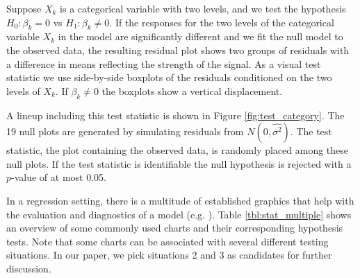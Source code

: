 \documentclass{article}
\newcommand{\blue}[1]{{\color{blue} #1}}
\begin{document}
Suppose $X_k$ is a categorical variable with two levels, and we test the hypothesis $H_0:\beta_k=0$ vs $H_1: \beta_k \ne 0$. If the responses for the two levels of the categorical variable $X_k$ in the model are significantly different and we fit the null model to the observed data, the resulting residual plot shows two groups of residuals \blue{with a difference in means reflecting the strength of the signal}. As a visual test statistic we use side-by-side boxplots of the residuals conditioned on the two levels of $X_k$. If $\beta_k\ne 0$ the boxplots show a vertical displacement. 


A lineup including this test statistic is shown in Figure \ref{fig:test_category}. The 19 null plots are generated  by simulating residuals from $N(0,\hat{\sigma^2})$. The test statistic, the plot containing the observed data, is randomly placed among these null plots. If the test statistic is identifiable the null hypothesis is rejected with a $p$-value of at most 0.05.

In a regression setting, there is a multitude of established graphics that help with the evaluation and diagnostics of a model (e.g. \citep{cook:99}). Table \ref{tbl:stat_multiple} shows an overview of some commonly used charts and their corresponding hypothesis tests. Note that some charts can be associated with several different testing situations. In our paper, we pick  situations 2 and 3 as candidates for further discussion.
\end{document}
